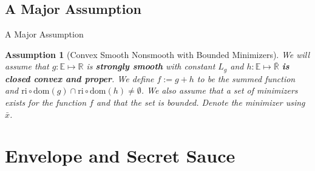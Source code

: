 \documentclass[11pt]{beamer}
\newtheorem{assumption}{Assumption}
\begin{document}
    \subsection{A Major Assumption}    
        \begin{frame}{A Major Assumption}
            \begin{assumption}[Convex Smooth Nonsmooth with Bounded Minimizers]\label{assumption:1}
                We will assume that $g:\mathbb E\mapsto \mathbb R$ is \textbf{strongly smooth} with constant $L_g$ and $h:\mathbb E \mapsto \bar{\mathbb R}$ \textbf{is closed convex and proper}. We define $f := g + h$ to be the summed function and $\text{ri}\circ \text{dom}(g) \cap \text{ri}\circ \text{dom}(h) \neq \emptyset$. We also assume that a set of minimizers exists for the function $f$ and that the set is bounded. Denote the minimizer using $\bar x$. 
            \end{assumption}
        \end{frame}
        
    
\section{Envelope and Secret Sauce}
\end{document}
